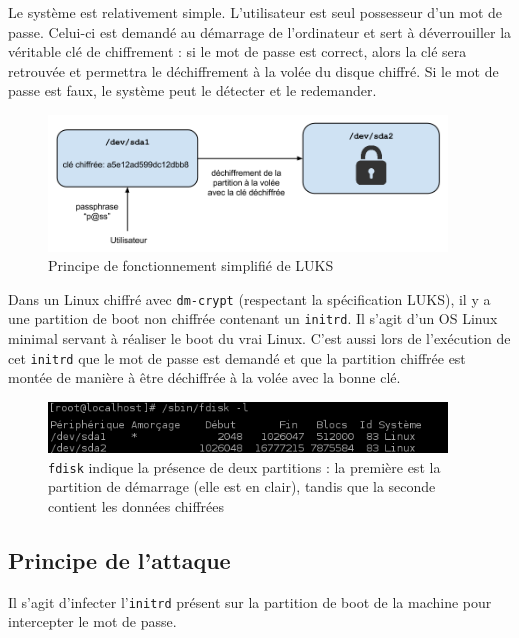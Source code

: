 \documentclass[12pt,a4paper]{article}
\begin{document}
Le système est relativement simple. L'utilisateur est seul possesseur d'un mot de passe. Celui-ci est demandé au démarrage de l'ordinateur et sert à déverrouiller la véritable clé de chiffrement : si le mot de passe est correct, alors la clé sera retrouvée et permettra le déchiffrement à la volée du disque chiffré. Si le mot de passe est faux, le système peut le détecter et le redemander.

\begin{figure}[H]
	\centering
	\includegraphics[width=400px]{img/luks_principe.png}
	\caption{Principe de fonctionnement simplifié de LUKS}
\end{figure}

Dans un Linux chiffré avec \texttt{dm-crypt} (respectant la spécification LUKS), il y a une partition de boot non chiffrée contenant un \texttt{initrd}. Il s'agit d'un OS Linux minimal servant à réaliser le boot du vrai Linux. C'est aussi lors de l'exécution de cet \texttt{initrd} que le mot de passe est demandé et que la partition chiffrée est montée de manière à être déchiffrée à la volée avec la bonne clé.

\begin{figure}[H]
	\centering
	\includegraphics[width=400px]{img/luks_fdisk.png}
	\caption{\texttt{fdisk} indique la présence de deux partitions : la première est la partition de démarrage (elle est en clair), tandis que la seconde contient les données chiffrées}
\end{figure}

\subsection{Principe de l'attaque}

Il s'agit d'infecter l'\texttt{initrd} présent sur la partition de boot de la
machine pour intercepter le mot de passe.
\end{document}
